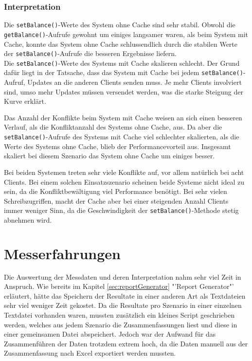 \subsubsection{Interpretation}


Die \texttt{setBalance()}-Werte des System ohne Cache sind sehr stabil. Obwohl die \texttt{getBalance()}-Aufrufe gewohnt um einiges langsamer waren, als beim System mit Cache, konnte das System ohne Cache schlussendlich durch die stabilen Werte der \texttt{setBalance()}-Aufrufe die besseren Ergebnisse liefern.\\

Die \texttt{setBalance()}-Werte des Systems mit Cache skalieren schlecht. Der Grund dafür liegt in der Tatsache, dass das System mit Cache bei jedem \texttt{set\-Balance()}-Auf\-ru\-f, Updates an die anderen Clients senden muss. Je mehr Clients involviert sind, umso mehr Updates müssen versendet werden, was die starke Steigung der Kurve erklärt.

Das Anzahl der Konflikte beim System mit Cache weisen an sich einen besseren Verlauf, als die Konfliktanzahl des Systems ohne Cache, aus. Da aber die \texttt{set\-Balance()}-Auf\-ru\-fe des Systems mit Cache viel schlechter skalierten, als die Werte des Systems ohne Cache, blieb der Performancevorteil aus. Insgesamt skaliert bei diesem Szenario das System ohne Cache um einiges besser.

Bei beiden Systemen treten sehr viele Konflikte auf, vor allem natürlich bei acht Clients. Bei einem solchen Einsatzszenario scheinen beide Systeme nicht ideal zu sein, da die Konfliktbewältigung viel Performance benötigt. Bei sehr vielen Schreibzugriffen, macht der Cache aber bei einer steigenden Anzahl Clients immer weniger Sinn, da die Geschwindigkeit der  \texttt{setBalance()}-Methode stetig abnehmen wird.

\section{Messerfahrungen}
Die Auswertung der Messdaten und deren Interpretation nahm sehr viel Zeit in Anspruch. Wie bereits im Kapitel \ref{sec:reportGenerator} "'Report Generator"' erläutert, hätte das Speichern der Resultate in einer anderen Art als Textdateien sehr viel weniger Zeit gekostet. Da die Resultate pro Szenario in einer einzelnen Textdatei vorhanden waren, mussten zusätzlich ein kleines Script geschrieben werden, welches  aus jedem Szenario die Zusammenfassungen liest und diese in einer gemeinsamen Datei abspeichert. Jedoch war der Aufwand für das Zusammenführen der Daten trotzdem extrem hoch, da die Daten manuell aus der Zusammenfassung nach Excel exportiert werden mussten. 


